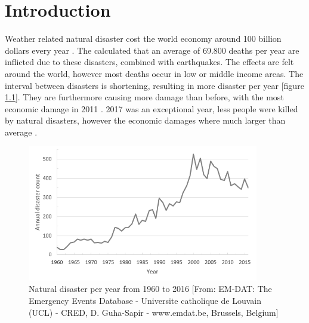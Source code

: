 \chapter{Introduction} \label{intro}

Weather related natural disaster cost the world economy around 100 billion dollars every year \citep{Kousky2014}. The \citet{CRED2015} calculated that an average of 69.800 deaths per year are inflicted due to these disasters, combined with earthquakes. The effects are felt around the world,  however most deaths occur in low or middle income areas. The interval between disasters is shortening, resulting in more disaster per year [figure \ref{fig:graph1}]. They are furthermore causing more damage than before, with the most economic damage in 2011 \citep{Kerle2015}. 2017 was an exceptional year, less people were killed by natural disasters, however the economic damages where much larger than average \citep{RE2018}. 
\\
\begin{figure}[h]
	\centering
	\includegraphics[width=0.9\textwidth]{figs/graph2.png}
	\caption{Natural disaster per year from 1960 to 2016 [From:  EM-DAT: The Emergency Events Database - Universite catholique de Louvain (UCL) - CRED, D. Guha-Sapir - www.emdat.be, Brussels, Belgium]}
	\label{fig:graph1}
\end{figure}

